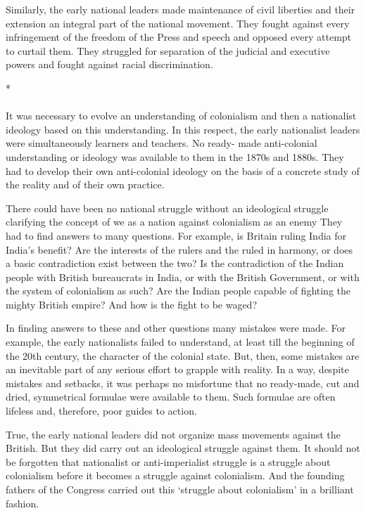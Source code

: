 Similarly, the early national leaders made maintenance of civil liberties and their extension an integral part of the national movement. They fought against every infringement of the freedom of the Press and speech and opposed every attempt to curtail them. They struggled for separation of the judicial and executive powers and fought against racial discrimination.

\begin{center}*\end{center}

\paragraph*{}


It was necessary to evolve an understanding of colonialism and then a nationalist ideology based on this understanding. In this respect, the early nationalist leaders were simultaneously learners and teachers. No ready- made anti-colonial understanding or ideology was available to them in the 1870s and 1880s. They had to develop their own anti-colonial ideology on the basis of a concrete study of the reality and of their own practice.

There could have been no national struggle without an ideological struggle clarifying the concept of we as a nation against colonialism as an enemy They had to find answers to many questions. For example, is Britain ruling India for India's benefit? Are the interests of the rulers and the ruled in harmony, or does a basic contradiction exist between the two? Is the contradiction of the Indian people with British bureaucrats in India, or with the British Government, or with the system of colonialism as such? Are the Indian people capable of fighting the mighty British empire? And how is the fight to be waged?

In finding answers to these and other questions many mistakes were made. For example, the early nationalists failed to understand, at least till the beginning of the 20th century, the character of the colonial state. But, then, some mistakes are an inevitable part of any serious effort to grapple with reality. In a way, despite mistakes and setbacks, it was perhaps no misfortune that no ready-made, cut and dried, symmetrical formulae were available to them. Such formulae are often lifeless and, therefore, poor guides to action.

True, the early national leaders did not organize mass movements against the British. But they did carry out an ideological struggle against them. It should not be forgotten that nationalist or anti-imperialist struggle is a struggle about colonialism before it becomes a struggle against colonialism. And the founding fathers of the Congress carried out this `struggle about colonialism' in a brilliant fashion.

